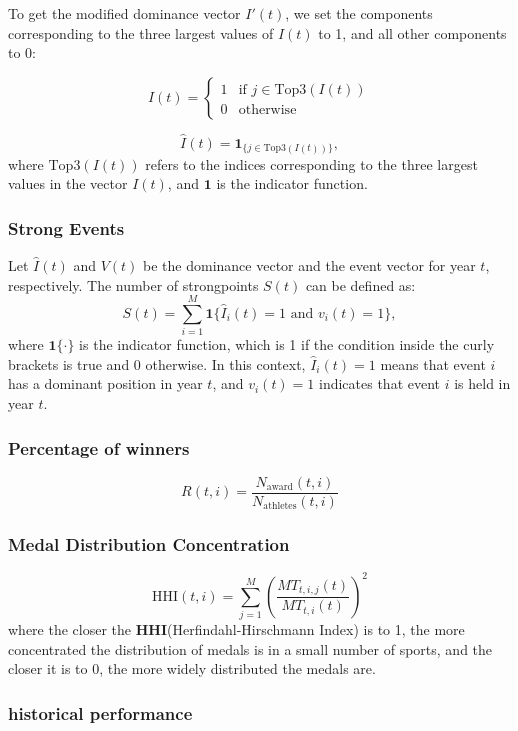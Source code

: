 \documentclass{mcmthesis}
\begin{document}
	To get the modified dominance vector \( I'(t) \), we set the components corresponding to the three largest values of \( I(t) \) to 1, and all other components to 0:
	
	\[
	\hat{I}(t) = 
	\begin{cases} 
		1 & \text{if } j \in \text{Top3}(I(t)) \\
		0 & \text{otherwise}
	\end{cases}
	\]
	
	\[\hat{I}(t) = \mathbf{1}_{\{ j \in \text{Top3}(I(t)) \}},\]
	where \( \text{Top3}(I(t)) \) refers to the indices corresponding to the three largest values in the vector \( I(t) \), and \( \mathbf{1} \) is the indicator function.
	
	
	\subsubsection{Strong Events}
	
	Let \( \hat{I}(t) \) and \( V(t) \) be the dominance vector and the event vector for year \( t \), respectively. The number of strongpoints \( S(t) \) can be defined as:
	\[
	S(t) = \sum_{i=1}^{M} \mathbf{1}\{ \hat{I}_i(t) = 1 \text{ and } v_i(t) = 1 \},
	\]
	where \( \mathbf{1}\{ \cdot \} \) is the indicator function, which is 1 if the condition inside the curly brackets is true and 0 otherwise. 
	In this context, \( \hat{I}_i(t) = 1 \) means that event \( i \) has a dominant position in year \( t \), and \( v_i(t) = 1 \) indicates that event \( i \) is held in year \( t \).
	
	
	\subsubsection{Percentage of winners}
	\[R(t,i) = \frac{N_{\text{award}}(t,i)}{N_{\text{athletes}}(t,i)}\]
	
	\subsubsection{Medal Distribution Concentration}
	\[
	\text{HHI}(t,i) = \sum_{j=1}^{M} \left( \frac{MT_{t,i,j}(t)}{MT_{t,i}(t)} \right)^2
	\]
	where the closer the \textbf{HHI}(Herfindahl-Hirschmann Index)\cite{HHI2016} is to 1, the more concentrated the distribution of medals is in a small number of sports, and the closer it is to 0, the more widely distributed the medals are.
	
	\subsubsection{historical performance}
	
\end{document}
